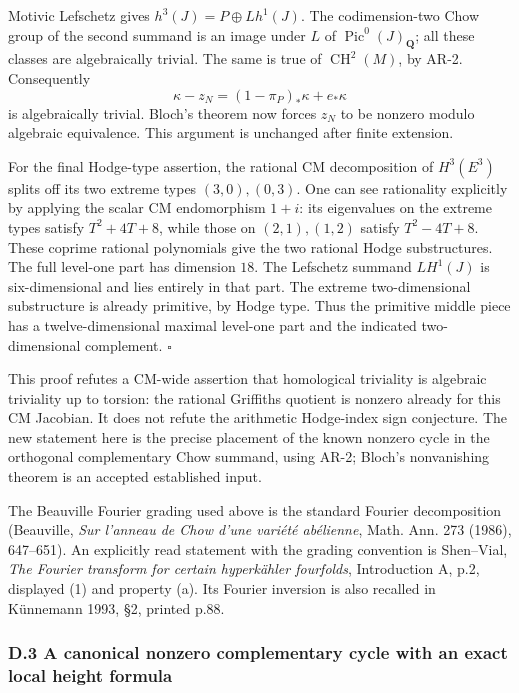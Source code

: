 Motivic Lefschetz gives \(h^3(J)=P\oplus Lh^1(J)\). The codimension-two
Chow group of the second summand is an image under \(L\) of
\(\operatorname{Pic}^0(J)_{\mathbf Q}\); all these classes are
algebraically trivial. The same is true of \(\operatorname{CH}^2(M)\),
by AR-2. Consequently \[
\kappa-z_N=(1-\pi_P)_*\kappa+e_*\kappa
\] is algebraically trivial. Bloch's theorem now forces \(z_N\) to be
nonzero modulo algebraic equivalence. This argument is unchanged after
finite extension.

For the final Hodge-type assertion, the rational CM decomposition of
\(H^3(E^3)\) splits off its two extreme types \((3,0),(0,3)\). One can
see rationality explicitly by applying the scalar CM endomorphism
\(1+i\): its eigenvalues on the extreme types satisfy \(T^2+4T+8\),
while those on \((2,1),(1,2)\) satisfy \(T^2-4T+8\). These coprime
rational polynomials give the two rational Hodge substructures. The full
level-one part has dimension \(18\). The Lefschetz summand \(LH^1(J)\)
is six-dimensional and lies entirely in that part. The extreme
two-dimensional substructure is already primitive, by Hodge type. Thus
the primitive middle piece has a twelve-dimensional maximal level-one
part and the indicated two-dimensional complement. \(\square\)

This proof refutes a CM-wide assertion that homological triviality is
algebraic triviality up to torsion: the rational Griffiths quotient is
nonzero already for this CM Jacobian. It does not refute the arithmetic
Hodge-index sign conjecture. The new statement here is the precise
placement of the known nonzero cycle in the orthogonal complementary
Chow summand, using AR-2; Bloch's nonvanishing theorem is an accepted
established input.

The Beauville Fourier grading used above is the standard Fourier
decomposition (Beauville, \emph{Sur l'anneau de Chow d'une variété
abélienne}, Math. Ann. 273 (1986), 647--651). An explicitly read
statement with the grading convention is Shen--Vial, \emph{The Fourier
transform for certain hyperkähler fourfolds}, Introduction A, p.2,
displayed (1) and property (a). Its Fourier inversion is also recalled
in Künnemann 1993, §2, printed p.88.

\subsubsection{D.3 A canonical nonzero complementary cycle with an exact
local height
formula}\label{d.3-a-canonical-nonzero-complementary-cycle-with-an-exact-local-height-formula}

